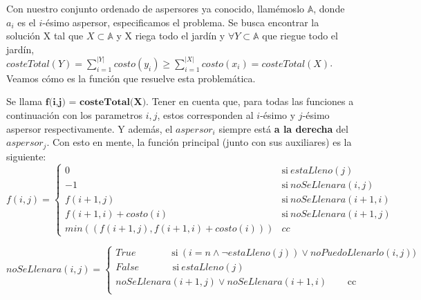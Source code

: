 \documentclass[./main.tex]{subfiles}
\begin{document}
Con nuestro conjunto ordenado de aspersores ya conocido, llamémoslo $\mathbb{A}$, donde $a_i$ es el \(i\)-ésimo aspersor, especificamos el problema. Se busca encontrar la solución X tal que $X \subset \mathbb{A}$ y X riega todo el jardín y $\forall Y \subset \mathbb{A}$ que riegue todo el jardín, $costeTotal(Y) = \sum_{i=1}^{|Y|}costo(y_{i}) \geq \sum_{i=1}^{|X|}costo(x_{i}) = costeTotal(X)$. Veamos cómo es la función que resuelve esta problemática.
\newline

Se llama $\textbf{f(i,j) = costeTotal(X)}$. Tener en cuenta que, para todas las funciones a continuación con los parametros $i,j$, estos corresponden al \(i\)-ésimo y \(j\)-ésimo aspersor respectivamente. Y además, el $aspersor_i$ siempre está \textbf{a la derecha} del $aspersor_j$. Con esto en mente, la función principal (junto con sus auxiliares) es la siguiente: 
\newline
\begin{equation}
 \label{función para el mínimo coste de aspersores}
 f(i,j) = \left\{
       \begin{array}{ll}
     0      & \mathrm{si\ } estaLleno(j) \\
     -1  & \mathrm{si\ } noSeLlenara(i,j) \\
     f(i+1,j)     & \mathrm{si\ } noSeLlenara(i+1,i) \\
     f(i+1,i) + costo(i)     & \mathrm{si\ } noSeLlenara(i+1,j) \\
     min((f(i+1,j), f(i+1,i) + costo(i))) & cc
       \end{array}
     \right.
\end{equation}


\begin{equation}
 \label{función para ver si se va a llenar el terreno}
 noSeLlenara(i,j) = \left\{
       \begin{array}{ll}
     True      \phantom{aaaaaaa} \mathrm{si\ } (i = n \land \neg estaLleno(j)) \lor noPuedoLlenarlo(i,j)) \\
     False   \phantom{aaaaaal} \mathrm{si\ } estaLleno(j) \\
     noSeLlenara(i+1,j) \lor noSeLlenara(i+1,i) \phantom{aaaa}  \mathrm{cc\ }  \\
       \end{array}
     \right.
\end{equation}
\end{document}
